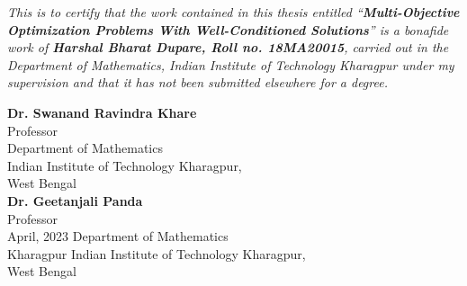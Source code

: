 % 
%  
\begin{Certificate}

\textit{This is to certify that the work contained in this thesis entitled ``\textbf{Multi-Objective Optimization Problems With Well-Conditioned Solutions}'' is a bonafide work of \textbf{Harshal Bharat Dupare, Roll no. 18MA20015}, carried out in the Department of Mathematics, Indian Institute of Technology Kharagpur under my supervision and that it has not been submitted elsewhere for a degree.}\\
\vspace*{1in}
\begin{flushright}
\textbf{Dr. Swanand Ravindra Khare}\\
Professor\\
\hfill Department of Mathematics\\
\hfill Indian Institute of Technology Kharagpur,\\
West Bengal\\
\vspace*{1in}
\textbf{Dr. Geetanjali Panda}\\
Professor\\
April, 2023 \hfill Department of Mathematics\\
Kharagpur \hfill Indian Institute of Technology Kharagpur,\\
West Bengal
\end{flushright}
\end{Certificate}

